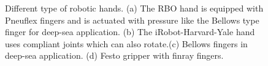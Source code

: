 \begin{figure}[ht]
\centering
{}\quad
{}
\caption[Robotic Hands]{\label{f:Robotic Hands} Different type of robotic hands. (a) The RBO hand is equipped with Pneuflex fingers and is actuated with pressure like the Bellows type finger for deep-sea application. (b) The iRobot-Harvard-Yale hand uses compliant joints which can also rotate.(c) Bellows fingers in deep-sea application. (d) Festo gripper with finray fingers.}
\end{figure}

